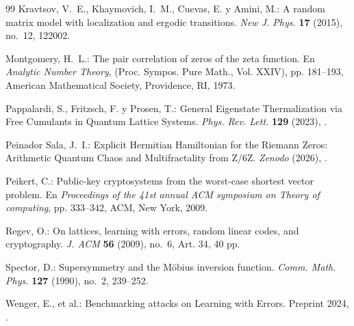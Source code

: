 \documentclass{article}
\numberwithin{equation}{section}
\theoremstyle{plain}
\theoremstyle{definition}
\begin{document}
\begin{thebibliography}{99}
Kravtsov, V.~E., Khaymovich, I.~M., Cuevas, E. y Amini, M.: 
A random matrix model with localization and ergodic transitions.
\emph{New J. Phys.} \textbf{17} (2015), no.~12, 122002.

Montgomery, H.~L.: 
The pair correlation of zeros of the zeta function.
En \emph{Analytic Number Theory}, (Proc. Sympos. Pure Math., Vol. XXIV), 
pp. 181--193, American Mathematical Society, Providence, RI, 1973.

Pappalardi, S., Fritzsch, F. y Prosen, T.:
General Eigenstate Thermalization via Free Cumulants in Quantum Lattice Systems.
\emph{Phys. Rev. Lett.} \textbf{129} (2023), .

Peinador Sala, J.~I.: 
Explicit Hermitian Hamiltonian for the Riemann Zeros: Arithmetic Quantum Chaos and Multifractality from Z/6Z. 
\emph{Zenodo} (2026), .

Peikert, C.: 
Public-key cryptosystems from the worst-case shortest vector problem.
En \emph{Proceedings of the 41st annual ACM symposium on Theory of computing}, 
pp. 333--342, ACM, New York, 2009.

Regev, O.: 
On lattices, learning with errors, random linear codes, and cryptography.
\emph{J. ACM} \textbf{56} (2009), no.~6, Art. 34, 40 pp.

Spector, D.: 
Supersymmetry and the M\"{o}bius inversion function. 
\emph{Comm. Math. Phys.} \textbf{127} (1990), no.~2, 239--252.

Wenger, E., et al.: 
Benchmarking attacks on Learning with Errors. 
Preprint 2024, .

\end{thebibliography}
\end{document}
